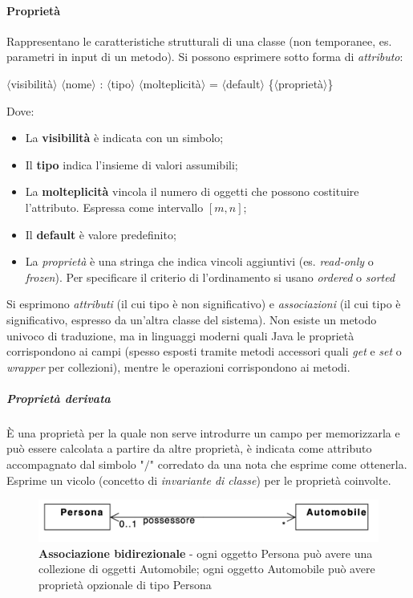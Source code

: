 \paragraph{Proprietà} Rappresentano le caratteristiche strutturali di una classe (non temporanee, es. parametri in input di un metodo). Si possono esprimere sotto forma di \textit{attributo}:
\begin{center}
    $\langle$visibilità$\rangle$ $\langle$nome$\rangle$ : $\langle$tipo$\rangle$ $\langle$molteplicità$\rangle$ = $\langle$default$\rangle$ \{$\langle$proprietà$\rangle$\}
\end{center}
Dove:
\begin{itemize}
    \item La \textbf{visibilità} è indicata con un simbolo;
    \item Il \textbf{tipo} indica l'insieme di valori assumibili;
    \item La \textbf{molteplicità} vincola il numero di oggetti che possono costituire l'attributo. Espressa come intervallo $[m, n]$;
    \item Il \textbf{default} è valore predefinito;
    \item La \textit{proprietà} è una stringa che indica vincoli aggiuntivi (es. \textit{read-only} o \textit{frozen}). Per specificare il criterio di l'ordinamento si usano \textit{ordered} o \textit{sorted}
\end{itemize}
Si esprimono \textit{attributi} (il cui tipo è non significativo) e \textit{associazioni} (il cui tipo è significativo, espresso da un'altra classe del sistema).
Non esiste un metodo univoco di traduzione, ma in linguaggi moderni quali Java le proprietà corrispondono ai campi (spesso esposti tramite metodi accessori quali \textit{get} e \textit{set} o \textit{wrapper} per collezioni), mentre le operazioni corrispondono ai metodi.

\subparagraph{Proprietà derivata} È una proprietà per la quale non serve introdurre un campo per memorizzarla e può essere calcolata a partire da altre proprietà, è indicata come attributo accompagnato dal simbolo "$/$" corredato da una nota che esprime come ottenerla. Esprime un vicolo (concetto di \textit{invariante di classe}) per le proprietà coinvolte.

\begin{figure}[h!]
    \centering
    \includegraphics[width=0.75\linewidth]{assets/UML/class/class-3.png}
    \caption{\textbf{Associazione bidirezionale} - ogni oggetto Persona può avere una collezione di oggetti Automobile; ogni oggetto Automobile può avere proprietà opzionale di tipo Persona}
\end{figure}

